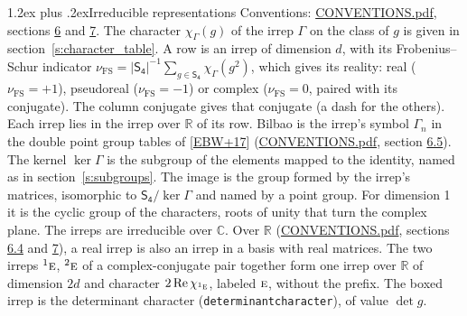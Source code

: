 \documentclass[10pt,a4paper]{article}
\makeatletter
\renewcommand\section{\@startsection{section}{1}{\z@}{-3ex plus -1ex minus -.2ex}%
  {1.2ex plus .2ex}{\normalfont\large\sffamily\bfseries\color{parttitle}}}
\numberwithin{equation}{section}
\newcommand{\grp}[1]{\mathsf{#1}}
\newcommand{\irr}[1]{\text{\normalfont\scshape #1}}
\newcommand{\conjpair}[1]{{}^{#1}}
\newcommand{\irchar}[1]{\chi_{#1}}
\newcommand{\fsind}{\nu_{\mathrm{FS}}}
\makeatother
\begin{document}
\section{Irreducible representations}\label{s:irreps}
Conventions: \href{../../CONVENTIONS.pdf}{CONVENTIONS.pdf}, sections \href{../../CONVENTIONS.pdf\#conv.6}{6} and \href{../../CONVENTIONS.pdf\#conv.7}{7}.
\leavevmode\label{n:function.character}\label{n:irrep.Gamma}The character $\irchar{\Gamma}(g)$ of the irrep $\Gamma$ on the class of $g$ is given in section~\ref{s:character_table}.
\leavevmode\label{n:index.dimension}\label{n:index.frobenius}\label{n:head.irrep}\label{n:head.reality}A row is an irrep of dimension $d$, with its Frobenius--Schur indicator $\fsind = |\grp{S_{4}}|^{-1}\allowbreak\sum_{g\in\grp{S_{4}}}\irchar{\Gamma}(g^2)$, which gives its reality: real ($\fsind = +1$), pseudoreal ($\fsind = -1$) or complex ($\fsind = 0$, paired with its conjugate). \label{n:head.conjugate}The column conjugate gives that conjugate (a dash for the others). \label{n:head.over.real}Each irrep lies in the irrep over $\mathbb{R}$ of its row. \label{n:head.bilbao}\label{n:irrep.alias.gamma}Bilbao is the irrep's symbol $\Gamma_n$ in the double point group tables of [\href{../../../REFERENCES.pdf\#ref.EBW+17}{EBW+17}] (\href{../../CONVENTIONS.pdf}{CONVENTIONS.pdf}, section \href{../../CONVENTIONS.pdf\#conv.6.5}{6.5}). \label{n:head.kernel}The kernel $\ker\Gamma$ is the subgroup of the elements mapped to the identity, named as in section~\ref{s:subgroups}. \label{n:head.image}The image is the group formed by the irrep's matrices, isomorphic to $\grp{S_{4}}/\ker\Gamma$ and named by a point group. For dimension 1 it is the cyclic group of the characters, roots of unity that turn the complex plane. The irreps are irreducible over $\mathbb{C}$. Over $\mathbb{R}$ (\href{../../CONVENTIONS.pdf}{CONVENTIONS.pdf}, sections \href{../../CONVENTIONS.pdf\#conv.6.4}{6.4} and \href{../../CONVENTIONS.pdf\#conv.7}{7}), a real irrep is also an irrep in a basis with real matrices. The two irreps $\conjpair{1}\irr{e}$, $\conjpair{2}\irr{e}$ of a complex-conjugate pair together form one irrep over $\mathbb{R}$ of dimension $2d$ and character $2\operatorname{Re}\irchar{\conjpair{1}\irr{e}}$, labeled $\irr{e}$, without the prefix. \label{n:mark.determinant}The boxed irrep is the determinant character (\texttt{determinantcharacter}), of value $\det g$.
\setlength{\emergencystretch}{2em}\par\setlength{\emergencystretch}{0pt}
\end{document}
